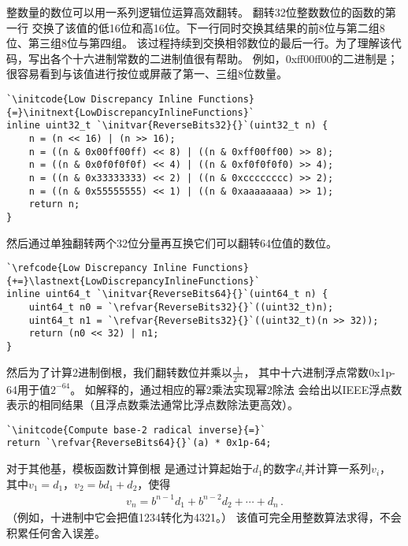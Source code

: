 整数量的数位可以用一系列逻辑位运算高效翻转。
翻转32位整数数位的函数的第一行
交换了该值的低16位和高16位。下一行同时交换其结果的前8位与第二组8位、第三组8位与第四组。
该过程持续到交换相邻数位的最后一行。为了理解该代码，写出各个十六进制常数的二进制值很有帮助。
例如，{\ttfamily 0xff00ff00}的二进制是{}；
很容易看到与该值进行按位或屏蔽了第一、三组8位数量。
\begin{lstlisting}
`\initcode{Low Discrepancy Inline Functions}{=}\initnext{LowDiscrepancyInlineFunctions}`
inline uint32_t `\initvar{ReverseBits32}{}`(uint32_t n) {
    n = (n << 16) | (n >> 16);
    n = ((n & 0x00ff00ff) << 8) | ((n & 0xff00ff00) >> 8);
    n = ((n & 0x0f0f0f0f) << 4) | ((n & 0xf0f0f0f0) >> 4);
    n = ((n & 0x33333333) << 2) | ((n & 0xcccccccc) >> 2);
    n = ((n & 0x55555555) << 1) | ((n & 0xaaaaaaaa) >> 1);
    return n;
}
\end{lstlisting}

然后通过单独翻转两个32位分量再互换它们可以翻转64位值的数位。
\begin{lstlisting}
`\refcode{Low Discrepancy Inline Functions}{+=}\lastnext{LowDiscrepancyInlineFunctions}`
inline uint64_t `\initvar{ReverseBits64}{}`(uint64_t n) {
    uint64_t n0 = `\refvar{ReverseBits32}{}`((uint32_t)n);
    uint64_t n1 = `\refvar{ReverseBits32}{}`((uint32_t)(n >> 32));
    return (n0 << 32) | n1;
}
\end{lstlisting}

然后为了计算2进制倒根，我们翻转数位并乘以$\displaystyle\frac{1}{2^{64}}$，
其中十六进制浮点常数{\ttfamily 0x1p-64}用于值$2^{-64}$。
如解释的，通过相应的幂2乘法实现幂2除法
会给出以IEEE浮点数表示的相同结果（且浮点数乘法通常比浮点数除法更高效）。
\begin{lstlisting}
`\initcode{Compute base-2 radical inverse}{=}`
return `\refvar{ReverseBits64}{}`(a) * 0x1p-64;
\end{lstlisting}

对于其他基，模板函数计算倒根
是通过计算起始于$d_1$的数字$d_i$并计算一系列$v_i$，
其中$v_1=d_1$，$v_2=bd_1+d_2$，使得
\begin{align*}
    v_n=b^{n-1}d_1+b^{n-2}d_2+\cdots+d_n\, .
\end{align*}
（例如，十进制中它会把值1234转化为4321。）
该值可完全用整数算法求得，不会积累任何舍入误差。

